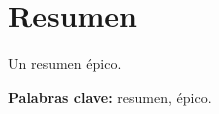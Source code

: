 \chapter*{Resumen}

\begin{spanish} %
\noindent Un resumen épico.

\bigskip

\noindent \textbf{Palabras clave:} resumen, épico.
\end{spanish}


